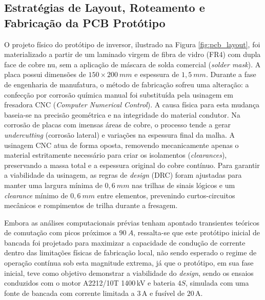 \subsection{Estratégias de Layout, Roteamento e Fabricação da PCB Protótipo}

O projeto físico do protótipo de inversor, ilustrado na Figura \ref{fig:pcb_layout}, foi materializado a partir de um laminado virgem de fibra de vidro (FR4) com dupla face de cobre nu, sem a aplicação de máscara de solda comercial (\textit{solder mask}). A placa possui dimensões de $150 \times 200 \: mm$ e espessura de $1,5 \: mm$. Durante a fase de engenharia de manufatura, o método de fabricação sofreu uma alteração: a confecção por corrosão química manual foi substituída pela usinagem em fresadora CNC (\textit{Computer Numerical Control}). A causa física para esta mudança baseia-se na precisão geométrica e na integridade do material condutor. Na corrosão de placas com imensas áreas de cobre, o processo tende a gerar \textit{undercutting} (corrosão lateral) e variações na espessura final da malha. A usinagem CNC atua de forma oposta, removendo mecanicamente apenas o material estritamente necessário para criar os isolamentos (\textit{clearances}), preservando a massa total e a espessura original do cobre contínuo. Para garantir a viabilidade da usinagem, as regras de \textit{design} (DRC) foram ajustadas para manter uma largura mínima de $0,6 \: mm$ nas trilhas de sinais lógicos e um \textit{clearance} mínimo de $0,6 \: mm$ entre elementos, prevenindo curtos-circuitos mecânicos e rompimentos de trilha durante a fresagem.

Embora as análises computacionais prévias tenham apontado transientes teóricos de comutação com picos próximos a $90 \: A$, ressalta-se que este protótipo inicial de bancada foi projetado para maximizar a capacidade de condução de corrente dentro das limitações físicas de fabricação local, não sendo esperado o regime de operação contínua sob esta magnitude extrema, já que o protótipo, em sua fase inicial, teve como objetivo demonstrar a viabilidade do \textit{design}, sendo os ensaios conduzidos com o motor A2212/10T 1400\,kV e bateria $4S$, simulada com uma fonte de bancada com corrente limitada a $3\,\text{A}$ e fusível de $20\,\text{A}$.

